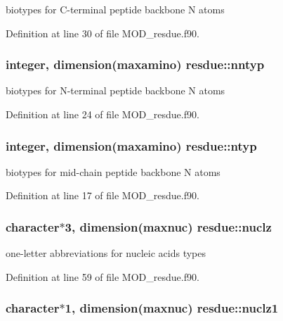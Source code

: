 biotypes for C-\/terminal peptide backbone N atoms 



Definition at line 30 of file M\-O\-D\-\_\-resdue.\-f90.

\hypertarget{classresdue_a82db5e55499ed18ed1d2f58bdf8e7312}{
\subsubsection[{nntyp}]{\setlength{\rightskip}{0pt plus 5cm}integer, dimension(maxamino) resdue\-::nntyp}}\label{classresdue_a82db5e55499ed18ed1d2f58bdf8e7312}


biotypes for N-\/terminal peptide backbone N atoms 



Definition at line 24 of file M\-O\-D\-\_\-resdue.\-f90.

\hypertarget{classresdue_ad2f7d43bb9fa7978c52b73d49772f424}{
\subsubsection[{ntyp}]{\setlength{\rightskip}{0pt plus 5cm}integer, dimension(maxamino) resdue\-::ntyp}}\label{classresdue_ad2f7d43bb9fa7978c52b73d49772f424}


biotypes for mid-\/chain peptide backbone N atoms 



Definition at line 17 of file M\-O\-D\-\_\-resdue.\-f90.

\hypertarget{classresdue_acb729218ac3b4c499e444a8aa0019071}{
\subsubsection[{nuclz}]{\setlength{\rightskip}{0pt plus 5cm}character$\ast$3, dimension(maxnuc) resdue\-::nuclz}}\label{classresdue_acb729218ac3b4c499e444a8aa0019071}


one-\/letter abbreviations for nucleic acids types 



Definition at line 59 of file M\-O\-D\-\_\-resdue.\-f90.

\hypertarget{classresdue_a01035bf726114e5ebe4baa0703e0b030}{
\subsubsection[{nuclz1}]{\setlength{\rightskip}{0pt plus 5cm}character$\ast$1, dimension(maxnuc) resdue\-::nuclz1}}\label{classresdue_a01035bf726114e5ebe4baa0703e0b030}


